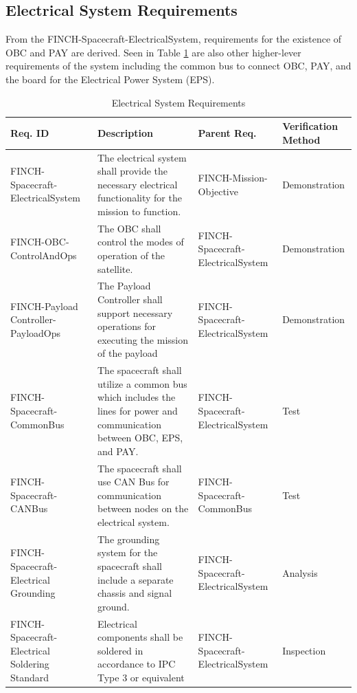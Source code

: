 \documentclass[12pt,a4paper]{article}
\begin{document}
    \subsection{Electrical System Requirements}
    From the FINCH-Spacecraft-ElectricalSystem, requirements for the existence of OBC and PAY are derived. Seen in Table \ref{tab:elec_sys_req} are also other higher-lever requirements of the system including the common bus to connect OBC, PAY, and the board for the Electrical Power System (EPS).
    \begin{table}[H]
        \centering
        \begin{tabular}{|>{\centering\arraybackslash}m{3cm} 
                    |>{\raggedright\arraybackslash}m{7cm} 
                    |>{\centering\arraybackslash}m{3cm} 
                    |>{\centering\arraybackslash}m{2.5cm}|}\hline
            \textbf{Req. ID} & \centering \textbf{Description} & \textbf{Parent Req.} & \textbf{Verification Method}\\\hline
             FINCH-Spacecraft-ElectricalSystem&  The electrical system shall provide the necessary electrical functionality for the mission to function. &  FINCH-Mission-Objective& Demonstration\\\hline
 FINCH-OBC-ControlAndOps& The OBC shall control the modes of operation of the satellite. & FINCH-Spacecraft-ElectricalSystem&Demonstration\\\hline
 FINCH-Payload Controller-PayloadOps& The Payload Controller shall support necessary operations for executing the mission of the payload& FINCH-Spacecraft-ElectricalSystem&Demonstration\\\hline
             FINCH-Spacecraft-CommonBus&  The spacecraft shall utilize a common bus which includes the lines for power and communication between OBC, EPS, and PAY. &  FINCH-Spacecraft-ElectricalSystem& Test\\\hline
             FINCH-Spacecraft-CANBus&  The spacecraft shall use CAN Bus for communication between nodes on the electrical system.&  FINCH-Spacecraft-CommonBus& Test\\\hline
             FINCH-Spacecraft-Electrical Grounding&  The grounding system for the spacecraft shall include a separate chassis and signal ground.&  FINCH-Spacecraft-ElectricalSystem& Analysis\\\hline
             FINCH-Spacecraft-Electrical Soldering Standard&  Electrical components shall be soldered in accordance to IPC Type 3 or equivalent&  FINCH-Spacecraft-ElectricalSystem& Inspection\\\hline
        \end{tabular}
        \caption{Electrical System Requirements}\label{tab:elec_sys_req}
    \end{table}
\end{document}
